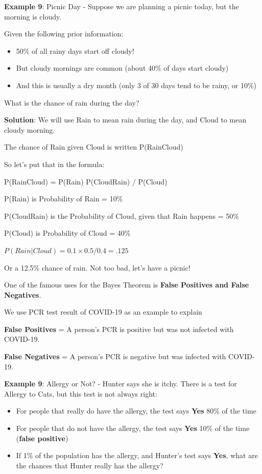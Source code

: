 \documentclass[
]{book}
\providecommand{\tightlist}{%
  \setlength{\itemsep}{0pt}\setlength{\parskip}{0pt}}
\begin{document}
\hfill\break

\textbf{Example 9}: Picnic Day - Suppose we are planning a picnic today, but the morning is cloudy.

Given the following prior information:

\begin{itemize}
\tightlist
\item
  50\% of all rainy days start off cloudy!
\item
  But cloudy mornings are common (about 40\% of days start cloudy)
\item
  And this is usually a dry month (only 3 of 30 days tend to be rainy, or 10\%)
\end{itemize}

What is the chance of rain during the day?

\textbf{Solution}: We will use Rain to mean rain during the day, and Cloud to mean cloudy morning.

The chance of Rain given Cloud is written P(Rain\textbar Cloud)

So let's put that in the formula:

P(Rain\textbar Cloud) = P(Rain) P(Cloud\textbar Rain) / P(Cloud)

P(Rain) is Probability of Rain = 10\%

P(Cloud\textbar Rain) is the Probability of Cloud, given that Rain happens = 50\%

P(Cloud) is Probability of Cloud = 40\%

\(P(Rain|Cloud) = 0.1 \times 0.5 /0.4 = .125\)

Or a 12.5\% chance of rain. Not too bad, let's have a picnic!

One of the famous uses for the Bayes Theorem is \textbf{False Positives and False Negatives}.

We use PCR test result of COVID-19 as an example to explain

\textbf{False Positives} = A person's PCR is positive but was not infected with COVID-19.

\textbf{False Negatives} = A person's PCR is negative but was infected with COVID-19.

\hfill\break

\textbf{Example 9}: Allergy or Not? - Hunter says she is itchy. There is a test for Allergy to Cats, but this test is not always right:

\begin{itemize}
\item
  For people that really do have the allergy, the test says \textbf{Yes} 80\% of the time
\item
  For people that do not have the allergy, the test says \textbf{Yes} 10\% of the time (\textbf{false positive})
\item
  If 1\% of the population has the allergy, and Hunter's test says \textbf{Yes}, what are the chances that Hunter really has the allergy?
\end{itemize}
\end{document}
